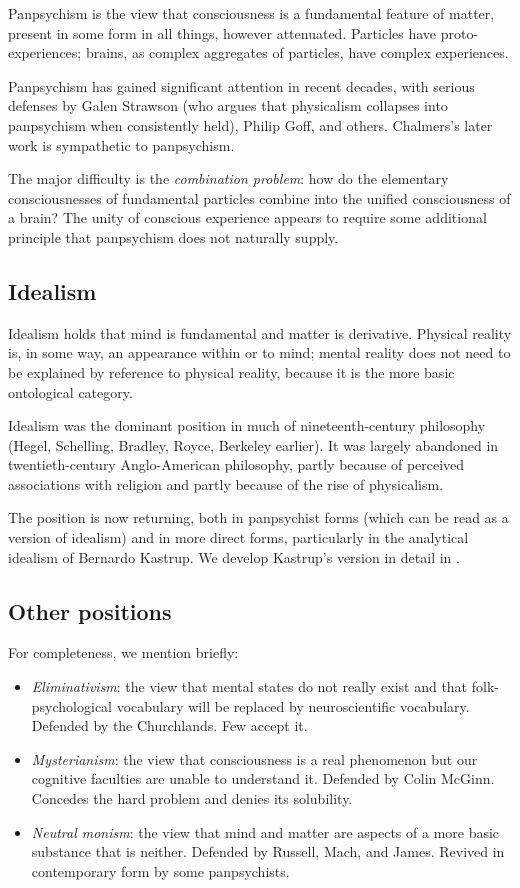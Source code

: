Panpsychism is the view that consciousness is a fundamental feature
of matter, present in some form in all things, however attenuated.
Particles have proto-experiences; brains, as complex aggregates of
particles, have complex experiences.

Panpsychism has gained significant attention in recent decades, with
serious defenses by Galen Strawson (who argues that physicalism
collapses into panpsychism when consistently held), Philip Goff,
and others. Chalmers's later work is sympathetic to panpsychism.

The major difficulty is the \emph{combination problem}: how do the
elementary consciousnesses of fundamental particles combine into
the unified consciousness of a brain? The unity of conscious
experience appears to require some additional principle that
panpsychism does not naturally supply.

\subsection{Idealism}

Idealism holds that mind is fundamental and matter is derivative.
Physical reality is, in some way, an appearance within or to mind;
mental reality does not need to be explained by reference to
physical reality, because it is the more basic ontological category.

Idealism was the dominant position in much of nineteenth-century
philosophy (Hegel, Schelling, Bradley, Royce, Berkeley earlier).
It was largely abandoned in twentieth-century Anglo-American
philosophy, partly because of perceived associations with religion
and partly because of the rise of physicalism.

The position is now returning, both in panpsychist forms (which can
be read as a version of idealism) and in more direct forms,
particularly in the analytical idealism of Bernardo Kastrup. We
develop Kastrup's version in detail in .

\subsection{Other positions}

For completeness, we mention briefly:

\begin{itemize}[leftmargin=2em]
    \item \emph{Eliminativism}: the view that mental states do not
    really exist and that folk-psychological vocabulary will be
    replaced by neuroscientific vocabulary. Defended by the
    Churchlands. Few accept it.
    \item \emph{Mysterianism}: the view that consciousness is a real
    phenomenon but our cognitive faculties are unable to understand
    it. Defended by Colin McGinn. Concedes the hard problem and
    denies its solubility.
    \item \emph{Neutral monism}: the view that mind and matter are
    aspects of a more basic substance that is neither. Defended by
    Russell, Mach, and James. Revived in contemporary form by some
    panpsychists.
\end{itemize}

